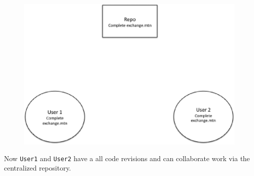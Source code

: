 \documentclass[12pt]{article}
\begin{document}
\begin{figure}[h]
\centering
   \includegraphics[scale=0.5]{figures/repo5.eps}
   \label{fig:R5}
\end{figure}

Now {\tt User1} and {\tt User2} have a all code revisions and can collaborate work via the centralized repository.
\end{document}
